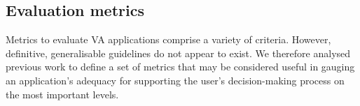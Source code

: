 \documentclass[final,5p,times,twocolumn,authoryear]{elsarticle}
\begin{document}




\subsection{Evaluation metrics} %
\label{sub:evaluation_metrics}


Metrics to evaluate VA applications comprise a variety of criteria. However, definitive, generalisable guidelines do not appear to exist. We therefore analysed previous work to define a set of metrics that may be considered useful in gauging an application's adequacy for supporting the user's decision-making process on the most important levels.
\end{document}
